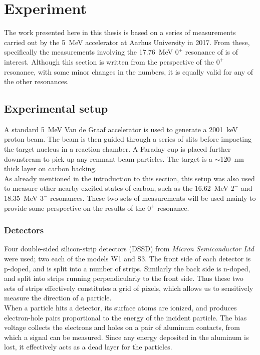 \section{Experiment}
The work presented here in this thesis is based on a series of measurements carried out by the \SI{5}{MeV} accelerator at Aarhus University in 2017. From these, specifically the measurements involving the \SI{17.76}{MeV} $0^+$ resonance of  is of interest. Although this section is written from the perspective of the $0^+$ resonance, with some minor changes in the numbers, it is equally valid for any of the other resonances. 

\subsection{Experimental setup}
A standard \SI{5}{MeV} Van de Graaf accelerator is used to generate a \SI{2001}{keV} proton beam. The beam is then guided through a series of slits before impacting the target nucleus in a reaction chamber. A Faraday cup is placed further downstream to pick up any remnant beam particles. The target is a $\sim$\SI{120}{nm} thick  layer on carbon backing. \\

As already mentioned in the introduction to this section, this setup was also used to measure other nearby excited states of carbon, such as the \SI{16.62}{MeV} $2^-$ and \SI{18.35}{MeV} $3^-$ resonances. These two sets of measurements will be used mainly to provide some perspective on the results of the $0^+$ resonance.

\subsubsection{Detectors}
Four double-sided silicon-strip detectors (DSSD) from \textit{Micron Semiconductor Ltd} were used; two each of the models W1 and S3. The front side of each detector is p-doped, and is split into a number of strips. Similarly the back side is n-doped, and split into strips running perpendicularly to the front side. Thus these two sets of strips effectively constitutes a grid of pixels, which allows us to sensitively measure the direction of a particle. \\

When a particle hits a detector, its surface atoms are ionized, and produces electron-hole pairs proportional to the energy of the incident particle. The bias voltage collects the electrons and holes on a pair of aluminum contacts, from which a signal can be measured. Since any energy deposited in the aluminum is lost, it effectively acts as a dead layer for the particles. \\

